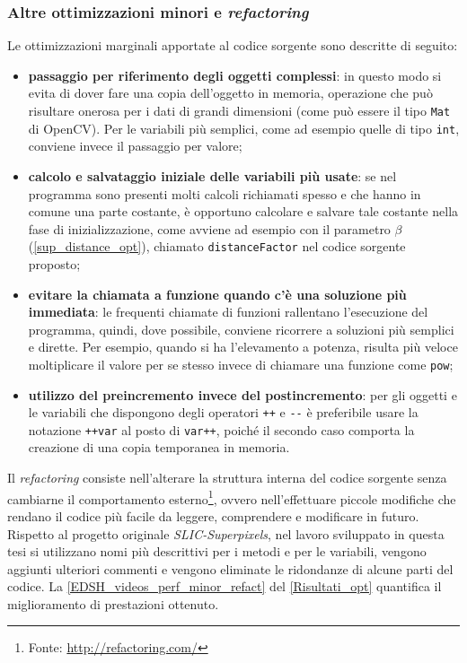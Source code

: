 \documentclass[12pt,a4paper,oneside]{article}
\begin{document}
\subsubsection{Altre ottimizzazioni minori e \textit{refactoring}}
Le ottimizzazioni marginali apportate al codice sorgente sono descritte di seguito:
\begin{itemize}
	\item\textbf{passaggio per riferimento degli oggetti complessi}: in questo modo si evita di dover fare una copia dell'oggetto in memoria, operazione che può risultare onerosa per i dati di grandi dimensioni (come può essere il tipo \texttt{Mat} di \gls{OpenCV}). Per le variabili più semplici, come ad esempio quelle di tipo \texttt{int}, conviene invece il passaggio per valore;
	\item\textbf{calcolo e salvataggio iniziale delle variabili più usate}: se nel programma sono presenti molti calcoli richiamati spesso e che hanno in comune una parte costante, è opportuno calcolare e salvare tale costante nella fase di inizializzazione, come avviene ad esempio con il parametro $\beta$ (\cref{sup_distance_opt}), chiamato \texttt{distanceFactor} nel codice sorgente proposto;
	\item\textbf{evitare la chiamata a funzione quando c'è una soluzione più immediata}: le frequenti chiamate di funzioni rallentano l'esecuzione del programma, quindi, dove possibile, conviene ricorrere a soluzioni più semplici e dirette. Per esempio, quando si ha l'elevamento a potenza, risulta più veloce moltiplicare il valore per se stesso invece di chiamare una funzione come \texttt{pow};
	\item\textbf{utilizzo del preincremento invece del postincremento}: per gli oggetti e le variabili che dispongono degli operatori \texttt{++} e \texttt{-{}-} è preferibile usare la notazione \texttt{++var} al posto di \texttt{var++}, poiché il secondo caso comporta la creazione di una copia temporanea in memoria.
\end{itemize}

\noindent Il \textit{refactoring} consiste nell'alterare la struttura interna del codice sorgente senza cambiarne il comportamento esterno\footnote{Fonte: \url{http://refactoring.com/}}, ovvero nell'effettuare piccole modifiche che rendano il codice più facile da leggere, comprendere e modificare in futuro. Rispetto al progetto originale \textit{SLIC-Superpixels}, nel lavoro sviluppato in questa tesi si utilizzano nomi più descrittivi per i metodi e per le variabili, vengono aggiunti ulteriori commenti e vengono eliminate le ridondanze di alcune parti del codice. La \cref{EDSH_videos_perf_minor_refact} del \cref{Risultati_opt} quantifica il miglioramento di prestazioni ottenuto.
\end{document}
